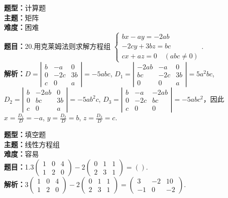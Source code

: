 \documentclass{ctexart}
\newenvironment{question}[5]{%
	\noindent\textbf{题型：}#1\\
	\textbf{主题：}#2\\
	\textbf{难度：}#3\\
	\textbf{题目：}#4\\
	\textbf{解析：}#5\\
	\vspace{1em}
}{}
\begin{document}
	\begin{question}
		{计算题}
		{矩阵}
		{困难}
		{20.用克莱姆法则求解方程组 \(\left\{\begin{array}{l}bx - ay = -2ab \\ -2cy + 3bz = bc \\ cx + az = 0 \quad (abc \neq 0)\end{array}\right.\). }
		{\(D=\left|\begin{array}{ccc}b & -a & 0 \\ 0 & -2c & 3b \\ c & 0 & a\end{array}\right|=-5abc\), \(D_1=\left|\begin{array}{ccc}-2ab & -a & 0 \\ bc & -2c & 3b \\ 0 & 0 & a\end{array}\right|=5a^2bc\), \(D_2=\left|\begin{array}{ccc}b & -2ab & 0 \\ 0 & bc & 3b \\ c & 0 & a\end{array}\right|=-5ab^2c\), \(D_3=\left|\begin{array}{ccc}b & -a & -2ab \\ 0 & -2c & bc \\ c & 0 & 0\end{array}\right|=-5abc^2\)，因此 \(x=\frac{D_1}{D}=-a\), \(y=\frac{D_2}{D}=b\), \(z=\frac{D_3}{D}=c\). }
	\end{question}
	
	
		
	\begin{question}
		{填空题}
		{线性方程组}
		{容易}
		{1.\(3\left(\begin{array}{lll}1 & 0 & 4 \\ 1 & 2 & 0\end{array}\right)-2\left(\begin{array}{lll}0 & 1 & 1 \\ 2 & 3 & 1\end{array}\right)=()\).}
		{\(3\left(\begin{array}{lll}1 & 0 & 4 \\ 1 & 2 & 0\end{array}\right)-2\left(\begin{array}{lll}0 & 1 & 1 \\ 2 & 3 & 1\end{array}\right)=\left(\begin{array}{ccc}3 & -2 & 10 \\ -1 & 0 & -2\end{array}\right)\).}
	\end{question}
	
\end{document}
